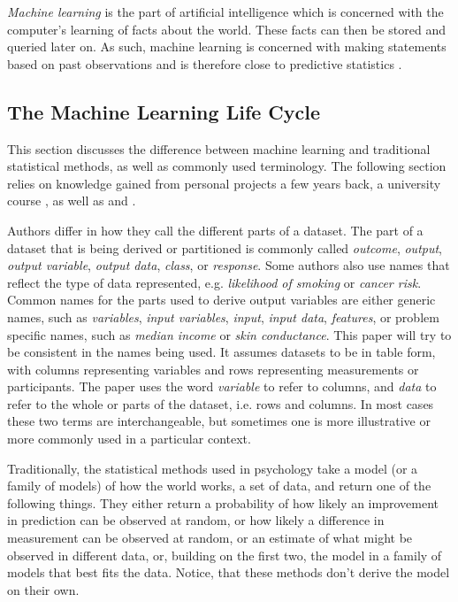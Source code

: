 \documentclass[a4paper,man,12pt,apacite,floatsintext,draftfirst]{apa6} %
\begin{document}
\emph{Machine learning} is the part of artificial intelligence which
is concerned with the computer's learning of facts about the world.
These facts can then be stored and queried later on.
As such, machine learning is concerned with making statements based
on past observations and is therefore close to predictive statistics
\cite{wpML}.

\subsection{The Machine Learning Life Cycle}
This section discusses the difference between machine learning and traditional
statistical methods, as well as commonly used terminology.
The following section relies on knowledge gained from personal projects a few
years back, a university course \cite{psymeth}, as well as 
and .

Authors differ in how they call the different parts of a dataset.
The part of a dataset that is being derived or partitioned is commonly called \emph{outcome},
\emph{output}, \emph{output variable}, \emph{output data}, \emph{class}, or \emph{response}.
Some authors also use names that reflect the type of data represented,
e.g. \emph{likelihood of smoking} or \emph{cancer risk}.
Common names for the parts used to derive output variables are either
generic names, such as \emph{variables}, \emph{input variables}, \emph{input}, \emph{input data}, \emph{features}, or
problem specific names, such as \emph{median income} or \emph{skin conductance}.
This paper will try to be consistent in the names being used.
It assumes datasets
to be in table form, with columns representing variables and rows representing
measurements or participants.
The paper uses the word \emph{variable} to refer to columns, and \emph{data}
to refer to the whole or parts of the dataset, i.e. rows and columns.
In most cases these two terms are interchangeable, but sometimes one is more
illustrative or more commonly used in a particular context.

Traditionally, the statistical methods used in psychology
take a model (or a family of models) of how the world works, a set of data, and return one of
the following things.
They either return a probability of how likely an improvement in prediction
can be observed at random, or how likely a difference in measurement can be
observed at random, or an estimate of what might be observed in different data,
or, building on the first two, the model in a family of models that best fits the data.
Notice, that these methods don't derive the model on their own.
\end{document}
